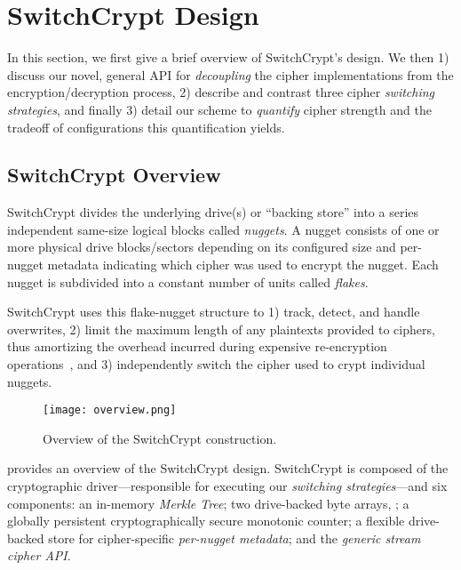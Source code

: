 \section{SwitchCrypt Design}\label{sec:design}

In this section, we first give a brief overview of SwitchCrypt's design. We then
1) discuss our novel, general API for \emph{decoupling} the cipher implementations from the
encryption/decryption process, 2) describe and contrast three
cipher \emph{switching strategies}, and finally 3) detail our scheme to
\emph{quantify} cipher strength and the tradeoff of configurations this quantification yields.

\subsection{SwitchCrypt Overview}

SwitchCrypt divides the underlying drive(s) or ``backing store'' into a series
independent same-size logical blocks called \emph{nuggets}. A nugget consists of
one or more physical drive blocks/sectors depending on its configured size and
per-nugget metadata indicating which cipher was used to encrypt the nugget. Each
nugget is subdivided into a constant number of units called \emph{flakes}.

SwitchCrypt uses this flake-nugget structure to 1) track, detect, and handle
overwrites, 2) limit the maximum length of any plaintexts provided to ciphers,
thus amortizing the overhead incurred during expensive re-encryption
operations~\cite{StrongBox}, and 3) independently switch the cipher used to
crypt individual nuggets.


\begin{figure}[ht]
   \centering
   \texttt{[image: overview.png]}
   \caption{Overview of the SwitchCrypt construction.}\label{fig:overview}
\end{figure}

 provides an overview of the SwitchCrypt design. SwitchCrypt is
composed of the cryptographic driver---responsible for executing our
\emph{switching strategies}---and six components: an in-memory \emph{Merkle
Tree}; two drive-backed byte arrays, ; a globally persistent cryptographically secure
monotonic counter; a flexible drive-backed store for cipher-specific
\emph{per-nugget metadata}; and the \emph{generic stream cipher API}.


